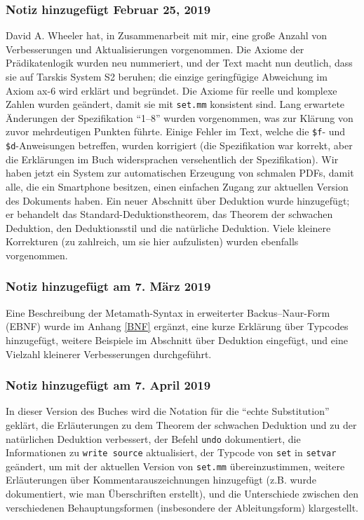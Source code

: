\subsubsection{Notiz hinzugefügt Februar 25, 2019}\label{note201902}

David A. Wheeler hat, in Zusammenarbeit mit mir, eine große Anzahl von Verbesserungen und Aktualisierungen vorgenommen.
Die Axiome der Prädikatenlogik wurden neu nummeriert, und der Text macht nun deutlich, dass sie auf Tarskis System S2 beruhen; die einzige geringfügige Abweichung im Axiom ax-6 wird erklärt und begründet.
Die Axiome für reelle und komplexe Zahlen wurden geändert, damit sie mit \texttt{set.mm}%
 konsistent sind.
Lang erwartete Änderungen der Spezifikation "`1--8"' wurden vorgenommen, was zur Klärung von zuvor mehrdeutigen Punkten führte.
Einige Fehler im Text, welche die \texttt{\$f}- und \texttt{\$d}-Anweisungen betreffen, wurden korrigiert (die Spezifikation war korrekt, aber die Erklärungen im Buch widersprachen versehentlich der Spezifikation).
Wir haben jetzt ein System zur automatischen Erzeugung von schmalen PDFs, damit alle, die ein Smartphone besitzen, einen einfachen Zugang zur aktuellen Version des Dokuments haben.
Ein neuer Abschnitt über Deduktion wurde hinzugefügt; er behandelt das Standard-Deduktionstheorem, das Theorem der schwachen Deduktion, den Deduktionsstil und die natürliche Deduktion.
Viele kleinere Korrekturen (zu zahlreich, um sie hier aufzulisten) wurden ebenfalls vorgenommen.


\subsubsection{Notiz hinzugefügt am 7. März 2019}\label{note201903}

Eine Beschreibung der Metamath-Syntax in erweiterter Backus--Naur-Form (EBNF) wurde im Anhang \ref{BNF} ergänzt, eine kurze Erklärung über Typcodes hinzugefügt, weitere Beispiele im Abschnitt über Deduktion eingefügt, und eine Vielzahl kleinerer Verbesserungen durchgeführt.


\subsubsection{Notiz hinzugefügt am 7. April 2019}\label{note201904}

In dieser Version des Buches wird die Notation für die "`echte Substitution"' geklärt, die
Erläuterungen zu dem Theorem der schwachen Deduktion und zu der natürlichen Deduktion verbessert,
der Befehl \texttt{undo} dokumentiert, die Informationen zu \texttt{write source} aktualisiert,  der Typcode von \texttt{set} in \texttt{setvar} geändert, um mit der aktuellen Version von \texttt{set.mm} übereinzustimmen, weitere Erläuterungen über Kommentarauszeichnungen hinzugefügt (z.B. wurde dokumentiert, wie man Überschriften erstellt), und die Unterschiede zwischen den verschiedenen Behauptungsformen (insbesondere der Ableitungsform) klargestellt.


